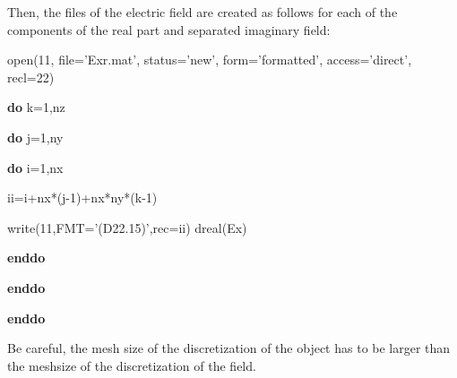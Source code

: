 Then, the files of the electric field are created as follows for 
each of the components of the real part and separated imaginary field:

\vspace{10mm}

open(11, file='Exr.mat', status='new', form='formatted', access='direct', recl=22)

{\bf do} k=1,nz

\hspace{5mm} {\bf do} j=1,ny

\hspace{10mm} {\bf do} i=1,nx 

\hspace{15mm} ii=i+nx*(j-1)+nx*ny*(k-1)

\hspace{15mm} write(11,FMT='(D22.15)',rec=ii) dreal(Ex)

\hspace{10mm} {\bf enddo}

\hspace{5mm} {\bf enddo}

{\bf enddo}

\vspace{10mm}

Be careful, the mesh size of the discretization of the object has to
be larger than the meshsize of the discretization of the field.
